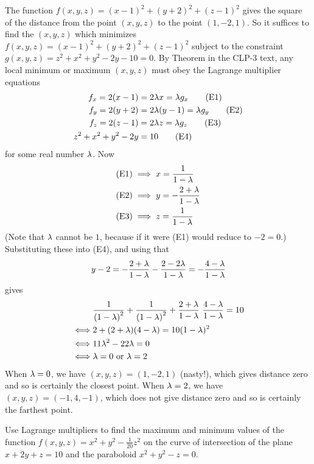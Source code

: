 \begin{solution}
The function $f(x,y,z)=(x-1)^2+(y+2)^2+(z-1)^2$ gives the square of 
the distance from  the point $(x,y,z)$ to the point $(1,-2,1)$. 
So it suffices to find the $(x,y,z)$ which minimizes $
f(x,y,z)=(x-1)^2+(y+2)^2+(z-1)^2$ subject 
to the constraint $g(x,y,z) = z^2 + x^2 + y^2 - 2y - 10=0$.
By Theorem  in the CLP-3 text, any local minimum
or maximum $(x,y,z)$ must obey the  Lagrange multiplier equations
\begin{align*}
f_x = 2(x-1) &= 2 \lambda x = \lambda g_x \tag{E1} \\ 
f_y = 2(y+2) &=2 \lambda (y-1)  = \lambda g_y \tag{E2} \\ 
f_z = 2(z-1) &= 2\lambda z = \lambda g_z \tag{E3} \\ 
z^2 + x^2 + y^2 - 2y &= 10 \tag{E4}
\end{align*}
for some real number $\lambda$. Now
\begin{align*}
\text{(E1)} &\implies x=\frac{1}{1-\lambda} \\
\text{(E2)} &\implies y=-\frac{2+\lambda}{1-\lambda} \\
\text{(E3)} &\implies z=\frac{1}{1-\lambda} 
\end{align*}
(Note that $\lambda$ cannot be $1$, because if it were (E1) would reduce to $-2=0$.)
Substituting these into (E4), and using that 
\begin{equation*}
y-2=-\frac{2+\lambda}{1-\lambda} -\frac{2-2\lambda}{1-\lambda}=-\frac{4-\lambda}{1-\lambda}
\end{equation*}
gives
\begin{align*}
&\frac{1}{{(1-\lambda)}^2}+\frac{1}{{(1-\lambda)}^2} 
   +\frac{2+\lambda}{1-\lambda}\ \frac{4-\lambda}{1-\lambda} = 10 \\
\iff & 2+(2+\lambda)(4-\lambda) = 10 (1-\lambda)^2 \\
\iff & 11\lambda^2 -22\lambda =0 \\
\iff & \lambda=0\text{ or }\lambda=2
\end{align*}
When $\lambda=0$, we have $(x,y,z) = (1,-2,1)$ (nasty!), which gives 
distance zero and so is certainly the closest point. 
When $\lambda=2$, we have $(x,y,z) = (-1,4,-1)$, which does not give 
distance zero and so is certainly the farthest point.

\end{solution}

\begin{question}[M200 2009A] %
Use Lagrange multipliers to find the maximum and minimum values of the 
function $f(x,y,z) = x^2 + y^2 -\frac{1}{20} z^2$ on the curve of 
intersection of the plane $x + 2y + z = 10$ and the paraboloid 
$x^2 + y^2 - z = 0$.
\end{question}

